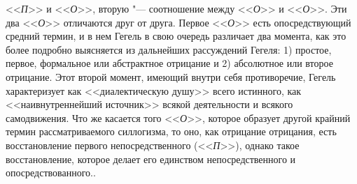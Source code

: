 {{{<<{\em П}>> и <<{\em О}>>, вторую "--- соотношение между <<{\em О}>> и
<<{\em О}>>. Эти два <<{\em О}>> отличаются друг от друга. Первое <<{\em О}>>
есть опосредствующий средний термин, и в нем Гегель в свою
очередь различает два момента, как это более подробно выясняется из
дальнейших рассуждений Гегеля: 1) простое, первое, формальное или
абстрактное отрицание и 2) абсолютное или второе отрицание. Этот второй
момент, имеющий внутри себя противоречие, Гегель характеризует как
<<диалектическую душу>> всего истинного, как <<наивнутреннейший источник>>
всякой деятельности и всякого самодвижения. Что же касается того <<{\em О}>>,
которое образует другой крайний термин рассматриваемого
силлогизма, то оно, как отрицание отрицания, есть восстановление первого
непосредственного (<<{\em П}>>),
однако такое восстановление, которое делает его единством
непосредственного и опосредствованного.\label{bkm:bm125}}.

}}
